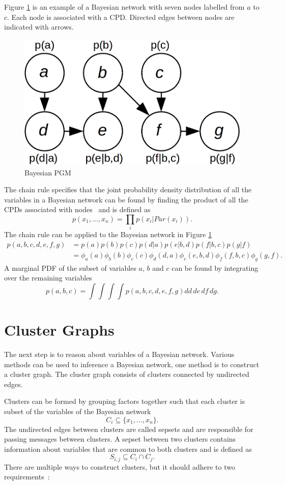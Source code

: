 \documentclass[12pt,oneside,openany,a4paper, %
afrikaans,english,
]{memoir}
\numberwithin{equation}{chapter}
\begin{document}
Figure \ref{fig:bays_pgm} is an example of a Bayesian network with seven nodes labelled from $a$ to $c$. Each node is associated with a CPD. Directed edges between nodes are indicated with arrows.
\begin{figure}[H]
  \includegraphics[width=0.5\linewidth]{Figures/bayesian_pgm.png}
  \centering
  \caption{Bayesian PGM}
  \label{fig:bays_pgm}
\end{figure}
The chain rule specifies that the joint probability density distribution of all the variables in a Bayesian network can be found by finding the product of all the CPDs associated with nodes~\citep{koller} and is defined as
\begin{equation}
p(x_1, ..., x_n) = \prod_i p(x_i|Par(x_i)).
\end{equation}
The chain rule can be applied to the Bayesian network in Figure \ref{fig:bays_pgm}
\begin{equation}
\begin{split}
p(a,b,c,d,e,f,g) & = p(a)p(b)p(c)p(d|a)p(e|b,d)p(f|b,c)p(g|f)\\
& = \phi_a(a)\phi_b(b)\phi_c(c)\phi_d(d,a)\phi_e(e,b,d)\phi_f(f,b,c)\phi_g(g,f).
\end{split}
\end{equation}
A marginal PDF of the subset of variables $a$, $b$ and $c$ can be found by integrating over the remaining variables
\begin{equation}
p(a,b,c) = \int\int\int\int p(a,b,c,d,e,f,g)dd\,de\,df\,dg.
\end{equation}
\section{Cluster Graphs}
The next step is to reason about variables of a Bayesian network. Various methods can be used to inference a Bayesian network, one method is to construct a cluster graph. The cluster graph consists of clusters connected by undirected edges.

Clusters can be formed by grouping factors together such that each cluster is subset of the variables of the Bayesian network
\begin{equation}
C_i \subseteq \{x_1, ..., x_n\}.
\end{equation}
The undirected edges between clusters are called sepsets and are responsible for passing messages between clusters. A sepset between two clusters contains information about variables that are common to both clusters and is defined as
\begin{equation}
S_{i,j} \subseteq C_i \cap C_j.
\end{equation}
There are multiple ways to construct clusters, but it should adhere to two requirements~\citep{koller}:
\end{document}
